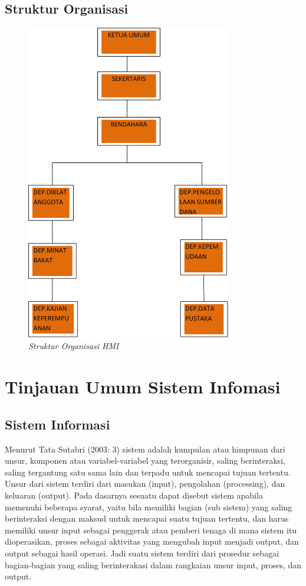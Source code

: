 \documentclass{jtetiproposalskripsi}
\begin{document}
\subsection{Struktur Organisasi}
\begin{figure}[ht!]
\centering
\includegraphics[width=0.8\textwidth]{gambar/Struktur}
\caption{\textit{Struktur Organisasi HMI}}
\label{wsn}
\end{figure}
\newpage

\section{Tinjauan Umum Sistem Infomasi}
\subsection{Sistem Informasi}
Menurut Tata Sutabri (2003: 3) sistem adalah kumpulan atau himpunan dari unsur, komponen atau variabel-variabel yang terorganisir, saling berinteraksi, saling tergantung satu sama lain dan terpadu untuk mencapai tujuan tertentu. Unsur dari sistem terdiri dari masukan (input), pengolahan (processing), dan keluaran (output). Pada dasarnya sesuatu dapat disebut sistem apabila memenuhi beberapa syarat, yaitu bila memiliki bagian (sub sistem) yang saling berinteraksi dengan maksud untuk mencapai suatu tujuan tertentu, dan harus memiliki unsur input sebagai penggerak atau pemberi tenaga di mana sistem itu dioperasikan, proses sebagai aktivitas yang mengubah input menjadi output, dan output sebagai hasil operasi. Jadi suatu sistem terdiri dari prosedur sebagai bagian-bagian yang saling berinterakasi dalam rangkaian unsur input, proses, dan output. 
	
\end{document}
